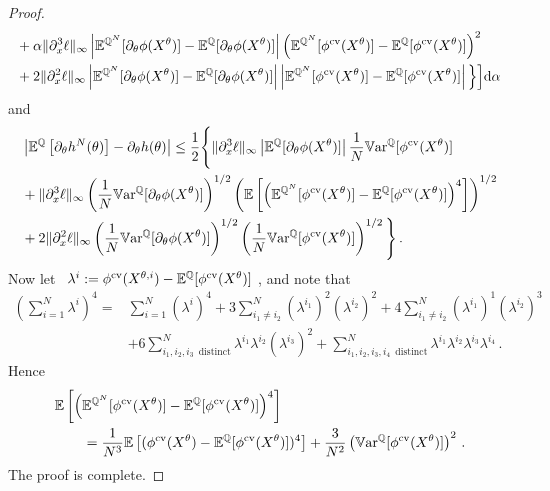 \begin{proof}
\[\begin{split}
 	 & + \alpha\| \partial_x^3 \ell\|_{\infty}
 	 \left| \mathbb{E}^{\mathbb{Q}^N}[\partial_\theta \phi(X^{\theta})] - \mathbb{E}^{\mathbb{Q}}[\partial_\theta \phi(X^{\theta})] \right|
 	   \left(\mathbb{E}^{\mathbb{Q}^N}[\phi^{\textup{cv}}(X^{\theta})]  - \mathbb{E}^{\mathbb{Q}}[\phi^{\textup{cv}}(X^{\theta})]  \right)^2 \\
 & + 2 \| \partial_x^2 \ell\|_{\infty}  \left| \mathbb{E}^{\mathbb{Q}^N}[\partial_{\theta}\phi(X^{\theta})]  - \mathbb{E}^{\mathbb{Q}}[\partial_{\theta}\phi(X^{\theta})]  \right|\left|\mathbb{E}^{\mathbb{Q}^N}[\phi^{\textup{cv}}(X^{\theta})]  - \mathbb{E}^{\mathbb{Q}}[\phi^{\textup{cv}}(X^{\theta})] \right|\Big\} \Big]\mathrm{d}\alpha\,
 \end{split}
 \]
and
 \[
 \begin{split}
 &\left| \mathbb{E}^{\mathbb{Q}}\left[\partial_{\theta} h^{N}(\theta)\right] -  \partial_{\theta}h(\theta) \right| \leq \frac{1}{2}  \Bigg\{ \| \partial_x^3 \ell\|_{\infty}  \left| \mathbb{E}^{\mathbb{Q}}[\partial_\theta \phi(X^{\theta})]\right|
 \frac{1}{N}\mathbb{V}\mathrm{ar}^{\mathbb{Q}}[\phi^{\textup{cv}}(X^{\theta})] \\
 	 & + \| \partial_x^3 \ell\|_{\infty}
 	  \left( \frac{1}{N}\mathbb{V}\mathrm{ar}^{\mathbb{Q}}[\partial_\theta \phi(X^{\theta})]\right)^{1/2}
 	   \left( \mathbb{E} \left[ \left(\mathbb{E}^{\mathbb{Q}^N}[\phi^{\textup{cv}}(X^{\theta})]  - \mathbb{E}^{\mathbb{Q}}[\phi^{\textup{cv}}(X^{\theta})]  \right)^4 \right] \right)^{1/2} \\
 & + 2 \| \partial_x^2 \ell\|_{\infty}  \left( \frac{1}{N} \mathbb{V}\mathrm{ar} ^{\mathbb{Q}}[\partial_{\theta}\phi(X^{\theta})]   \right)^{1/2}\left( \frac{1}{N} \mathbb{V}\mathrm{ar} ^{\mathbb{Q}}[\phi^{\textup{cv}}(X^{\theta})] \right)^{1/2}\Bigg\}\,.
 \end{split}
 \]
Now let ~$\lambda^i:= \phi^{\textup{cv}}(X^{\theta,i}) - \mathbb{E}^{\mathbb{Q}}[\phi^{\textup{cv}}(X^{\theta})]~$, and note that
 \[
 \begin{split}
\left( \sum_{i=1}^N \lambda^i \right)^4 
 =& \sum_{i=1}^N (\lambda^i )^4 + 3 \sum_{i_1\neq i_2}^N (\lambda^{i_1} )^2 (\lambda^{i_2} )^2
+ 4 \sum_{i_1\neq i_2 }^N (\lambda^{i_1} )^1 (\lambda^{i_2} )^3 \\
&+ 6 \sum_{i_1, i_2, i_3\,\,\,  \text{distinct} }^N \lambda^{i_1} \lambda^{i_2} (\lambda^{i_3} )^2
+ \sum_{i_1, i_2, i_3,i_4 \,\,\,\text{distinct} }^N \lambda^{i_1} \lambda^{i_2}\lambda^{i_3}\lambda^{i_4}\,. 
\end{split}
 \]
Hence
\begin{align*}
&\mathbb{E} \left[ \left(\mathbb{E}^{\mathbb{Q}^N}[\phi^{\textup{cv}}(X^{\theta})]  - \mathbb{E}^{\mathbb{Q}}[\phi^{\textup{cv}}(X^{\theta})]  \right)^4 \right] \\
&\qquad = \frac{1}{N^3} \mathbb{E}\left[(\phi^{\textup{cv}}(X^{\theta}) - \mathbb{E}^{\mathbb{Q}}[\phi^{\textup{cv}}(X^{\theta})])^4\right]  +  \frac{3}{N^2} \left(\mathbb{V}\mathrm{ar} ^{\mathbb{Q}}[\phi^{\textup{cv}}(X^{\theta})]\right)^2\,. 
\end{align*}
The proof is complete.  
\end{proof}


